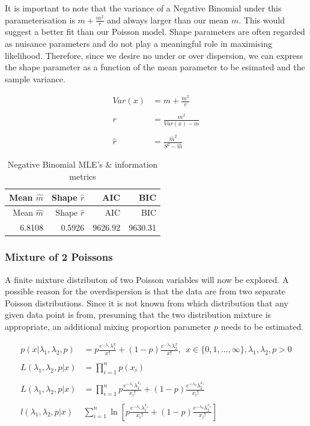 \documentclass[11pt,preprint, authoryear]{elsarticle}
\numberwithin{equation}{section}
\numberwithin{figure}{section}
\numberwithin{table}{section}
\begin{document}
It is important to note that the variance of a Negative Binomial under
this parameterisation is \(m + \frac{m^2}{r}\) and always larger than
our mean \(m\). This would suggest a better fit than our Poisson model.
Shape parameters are often regarded as nuisance parameters and do not
play a meaningful role in maximising likelihood. Therefore, since we
desire no under or over dispersion, we can express the shape parameter
as a function of the mean parameter to be esimated and the sample
variance.

\begin{align*}
Var(x) &= m + \frac{m^2}{r} \\
\\
r &= \frac{m^2}{Var(x) - m} \\
\\
\hat{r} &= \frac{\hat{m}^2}{S^2 - \hat{m}}
\end{align*}

\begin{longtable}[]{@{}rrrr@{}}
\caption{Negative Binomial MLE's \& information metrics}\tabularnewline
\toprule
Mean \(\hat{m}\) & Shape \(\hat{r}\) & AIC & BIC\tabularnewline
\midrule
\endfirsthead
\toprule
Mean \(\hat{m}\) & Shape \(\hat{r}\) & AIC & BIC\tabularnewline
\midrule
\endhead
6.8108 & 0.5926 & 9626.92 & 9630.31\tabularnewline
\bottomrule
\end{longtable}

\subsubsection{Mixture of 2 Poissons}\label{mixture-of-2-poissons}

A finite mixture distributon of two Poisson variables will now be
explored. A possible reason for the overdispersion is that the data are
from two separate Poisson distributions. Since it is not known from
which distribution that any given data point is from, presuming that the
two distribution mixture is appropriate, an additional mixing proportion
parameter \(p\) needs to be estimated.

\begin{align*} 
p(x|\lambda_1,\lambda_2,p) & =  p\frac{e^{-\lambda_1} \lambda_1^x}{x!} + (1-p)\frac{e^{-\lambda_2} \lambda_2^x}{x!},\ \ x\in \{0,1,\ldots,\infty\},\lambda_1 , \lambda_2 , p >0 \\
\\
L(\lambda_1,\lambda_2,p|x) & = \prod_{i=1}^n p(x_i) \\
\\
L(\lambda_1,\lambda_2,p|x) & =  \prod_{i=1}^n p\frac{e^{-\lambda_1} \lambda_1^{x_i}}{x_i!} + (1-p)\frac{e^{-\lambda_2} \lambda_2^{x_i}}{x_i!} \\
\\
l(\lambda_1,\lambda_2,p|x) & \sum^n_{i=1} \ln [ p\frac{e^{-\lambda_1} \lambda_1^{x_i}}{x_i!} + (1-p)\frac{e^{-\lambda_2} \lambda_2^{x_i}}{x_i!} ]
\end{align*}
\end{document}

